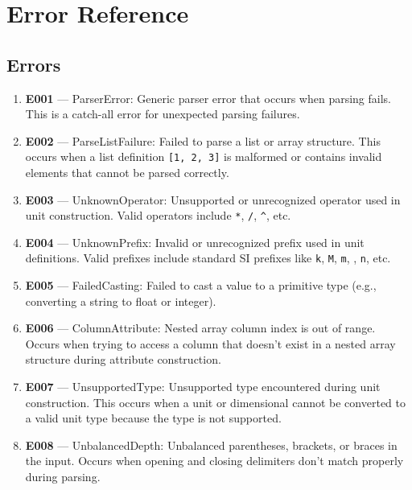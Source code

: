\documentclass[11pt]{article}
\begin{document}
\newpage

\section{Error Reference}

\subsection{Errors}

\begin{enumerate}
  \item \textbf{E001} --- ParserError: Generic parser error that occurs when parsing fails. This is a catch-all error for unexpected parsing failures.
  
  \item \textbf{E002} --- ParseListFailure: Failed to parse a list or array structure. This occurs when a list definition \texttt{[1, 2, 3]} is malformed or contains invalid elements that cannot be parsed correctly.
  
  \item \textbf{E003} --- UnknownOperator: Unsupported or unrecognized operator used in unit construction. Valid operators include \texttt{*}, \texttt{/}, \texttt{\^}, etc.
  
  \item \textbf{E004} --- UnknownPrefix: Invalid or unrecognized prefix used in unit definitions. Valid prefixes include standard SI prefixes like \texttt{k}, \texttt{M}, \texttt{m}, \texttt{\textmu}, \texttt{n}, etc.
  
  \item \textbf{E005} --- FailedCasting: Failed to cast a value to a primitive type (e.g., converting a string to float or integer).
  
  \item \textbf{E006} --- ColumnAttribute: Nested array column index is out of range. Occurs when trying to access a column that doesn't exist in a nested array structure during attribute construction.
  
  \item \textbf{E007} --- UnsupportedType: Unsupported type encountered during unit construction. This occurs when a unit or dimensional cannot be converted to a valid unit type because the type is not supported.
  
  \item \textbf{E008} --- UnbalancedDepth: Unbalanced parentheses, brackets, or braces in the input. Occurs when opening and closing delimiters don't match properly during parsing.
  

\end{enumerate}
\end{document}
